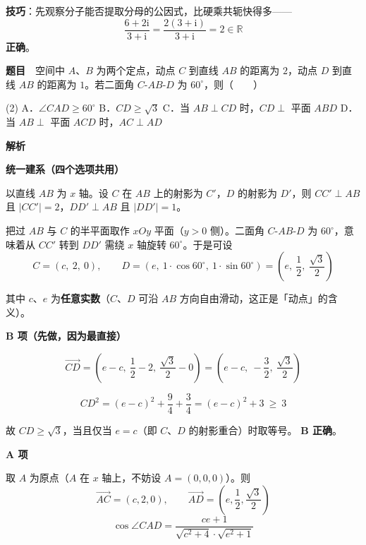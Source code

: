 \textbf{技巧}：先观察分子能否提取分母的公因式，比硬乘共轭快得多——
\[\frac{6+2\mathrm{i}}{3+\mathrm{i}}=\frac{2(3+\mathrm{i})}{3+\mathrm{i}}=2\in\mathbb{R}\]
 \textbf{正确}。


\par\medskip


\textbf{题目}　空间中 $A$、$B$ 为两个定点，动点 $C$ 到直线 $AB$ 的距离为 $2$，动点 $D$ 到直线 $AB$ 的距离为 $1$。若二面角 $C\text{-}AB\text{-}D$ 为 $60^\circ$，则（　　）

\begin{gkopts}(2)
\task A．$\angle CAD\ge 60^\circ$
\task B．$CD\ge\sqrt3$
\task C．当 $AB\perp CD$ 时，$CD\perp$ 平面 $ABD$
\task D．当 $AB\perp$ 平面 $ACD$ 时，$AC\perp AD$
\end{gkopts}

\textbf{解析}

\textbf{统一建系（四个选项共用）}

以直线 $AB$ 为 $x$ 轴。设 $C$ 在 $AB$ 上的射影为 $C'$，$D$ 的射影为 $D'$，则 $CC'\perp AB$ 且 $|CC'|=2$，$DD'\perp AB$ 且 $|DD'|=1$。

把过 $AB$ 与 $C$ 的半平面取作 $xOy$ 平面（$y>0$ 侧）。二面角 $C\text{-}AB\text{-}D$ 为 $60^\circ$，意味着从 $CC'$ 转到 $DD'$ 需绕 $x$ 轴旋转 $60^\circ$。于是可设
\[C=(c,\ 2,\ 0),\qquad D=\left(e,\ 1\cdot\cos60^\circ,\ 1\cdot\sin60^\circ\right)=\left(e,\ \frac12,\ \frac{\sqrt3}{2}\right)\]

其中 $c$、$e$ 为\textbf{任意实数}（$C$、$D$ 可沿 $AB$ 方向自由滑动，这正是「动点」的含义）。

\par\medskip

\textbf{B 项（先做，因为最直接）}

\[\overrightarrow{CD}=\left(e-c,\ \frac12-2,\ \frac{\sqrt3}{2}-0\right)=\left(e-c,\ -\frac32,\ \frac{\sqrt3}{2}\right)\]

\[CD^2=(e-c)^2+\frac94+\frac34=(e-c)^2+3\ \ge\ 3\]

故 $CD\ge\sqrt3$，当且仅当 $e=c$（即 $C$、$D$ 的射影重合）时取等号。 \textbf{B 正确}。

\par\medskip

\textbf{A 项}

取 $A$ 为原点（$A$ 在 $x$ 轴上，不妨设 $A=(0,0,0)$）。则
\[\overrightarrow{AC}=(c,2,0),\qquad \overrightarrow{AD}=\left(e,\frac12,\frac{\sqrt3}{2}\right)\]
\[\cos\angle CAD=\frac{ce+1}{\sqrt{c^2+4}\cdot\sqrt{e^2+1}}\]

